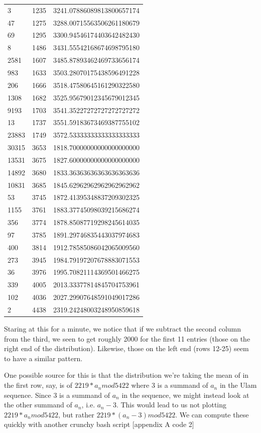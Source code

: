 \documentclass{article}
\theoremstyle{definition}
\theoremstyle{remark}
\numberwithin{equation}{section}
\begin{document}
\begin{tabular}{lll}
3	&1235	&3241.07886089813800657174\\
47	&1275	&3288.00715563506261180679\\
69	&1295	&3300.94546174403642482430\\
8	&1486	&3431.55542168674698795180\\
2581	&1607	&3485.87893462469733656174\\
983	&1633	&3503.28070175438596491228\\
206	&1666	&3518.47580645161290322580\\
1308	&1682	&3525.95679012345679012345\\
9193	&1703	&3541.35227272727272727272\\
13	&1737	&3551.59183673469387755102\\
23883	&1749	&3572.53333333333333333333\\
30315	&3653	&1818.70000000000000000000\\
13531	&3675	&1827.60000000000000000000\\
14892	&3680	&1833.36363636363636363636\\
10831	&3685	&1845.62962962962962962962\\
53	&3745	&1872.41395348837209302325\\
1155	&3761	&1883.37745098039215686274\\
356	&3774	&1878.85087719298245614035\\
97	&3785	&1891.29746835443037974683\\
400	&3814	&1912.78585086042065009560\\
273	&3945	&1984.79197207678883071553\\
36	&3976	&1995.70821114369501466275\\
339	&4005	&2013.33377814845704753961\\
102	&4036	&2027.29907648591049017286\\
2	&4438	&2319.24248003248950859618
\end{tabular}

Staring at this for a minute, we notice that if we subtract the second
column from the third, we seen to get roughly 2000 for the first 11
entries (those on the right end of the distribution).  Likewise, those
on the left end (rows 12-25) seem to have a similar pattern.

One possible source for this is that the distribution we're taking the
mean of in the first row, say, is of $2219*a_n mod 5422$ where 3 is a
summand of $a_n$ in the Ulam sequence.  Since 3 is a summand of $a_n$ in
the sequence, we might instead look at the other summand of $a_n$,
i.e. $a_n - 3$.  This would lead to us not plotting $2219*a_n mod 5422$,
but rather $2219*(a_n-3) mod 5422$.  We can compute these quickly with
another crunchy bash script [appendix A code 2]
\end{document}
